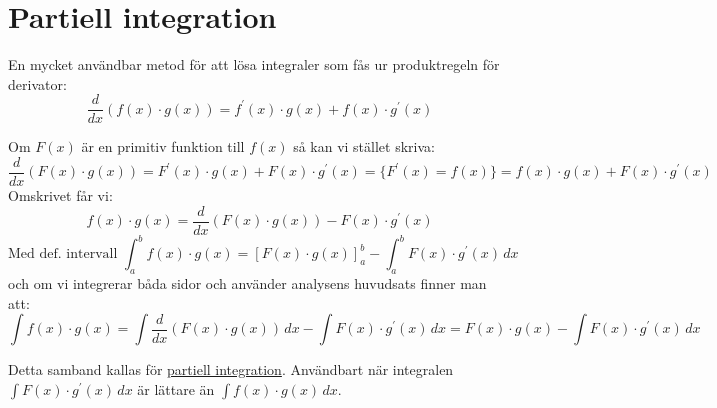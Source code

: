 \section{Partiell integration}
En mycket användbar metod för att lösa integraler som fås ur produktregeln för derivator:
\begin{equation*}
    \frac{d}{dx}(f(x)\cdot g(x))=f^\prime(x)\cdot g(x)+f(x)\cdot g^\prime(x)
\end{equation*}

Om $F(x)$ är en primitiv funktion till $f(x)$ så kan vi stället skriva:
\begin{equation*}
    \frac{d}{dx}(F(x)\cdot g(x))=F^\prime(x)\cdot g(x)+F(x)\cdot g^\prime(x)=
    \{F^\prime(x)=f(x)\}=f(x)\cdot g(x)+F(x)\cdot g^\prime(x)
\end{equation*}
Omskrivet får vi:
\begin{equation*}
    f(x)\cdot g(x)=\frac{d}{dx}(F(x)\cdot g(x))-F(x)\cdot g^\prime(x)
\end{equation*}
\begin{equation*}
    \text{Med def. intervall } \int_a^b f(x)\cdot g(x)=[F(x)\cdot g(x)]_a^b-\int_a^b F(x)\cdot g^\prime(x)\, dx
\end{equation*}
och om vi integrerar båda sidor och använder analysens huvudsats finner man att:
\begin{equation*}
    \int f(x)\cdot g(x) = \int\frac{d}{dx}(F(x)\cdot g(x))\, dx - \int F(x)\cdot g^\prime(x)\, dx=
    F(x)\cdot g(x)-\int F(x)\cdot g^\prime(x)\, dx
\end{equation*}

Detta samband kallas för \underline{partiell integration}.
Användbart när integralen $\int F(x)\cdot g^\prime(x)\, dx$ är lättare än $\int f(x)\cdot g(x)\, dx$.

